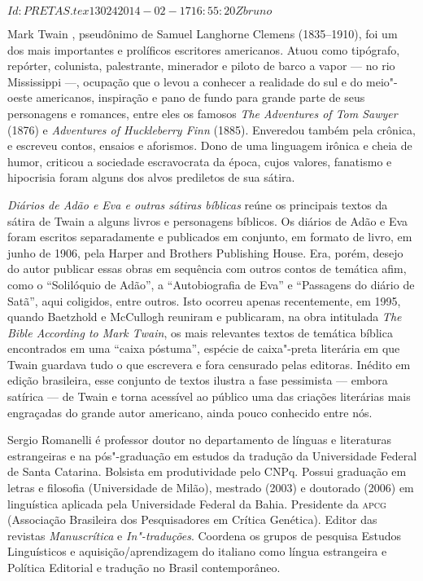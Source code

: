 \SVN $Id: PRETAS.tex 13024 2014-02-17 16:55:20Z bruno $ \begin{resumopage}

\item[Mark Twain], pseudônimo de Samuel Langhorne Clemens
(1835--1910), foi um dos mais importantes e prolíficos escritores americanos.
Atuou como tipógrafo, repórter, colunista, palestrante, minerador e piloto de
barco a vapor --- no rio Mississippi ---, ocupação que o levou a conhecer a
realidade do sul e do meio"-oeste americanos, inspiração e pano de fundo para
grande parte de seus personagens e romances, entre eles os famosos \textit{The
Adventures of Tom Sawyer} (1876) e \textit{Adventures of Huckleberry Finn}
(1885). Enveredou também pela crônica, e escreveu contos, ensaios e aforismos.
Dono de uma linguagem irônica e cheia de humor, criticou a sociedade
escravocrata da época, cujos valores, fanatismo e hipocrisia foram alguns dos
alvos prediletos de sua sátira.

\item[\textit{Diários de Adão e Eva e outras sátiras bíblicas}] reúne os principais
textos da sátira de Twain a alguns livros e personagens bíblicos. Os diários de
Adão e Eva foram escritos separadamente e publicados em conjunto, em formato de
livro, em junho de 1906, pela Harper and Brothers Publishing House. Era, porém,
desejo do autor publicar essas obras em sequência com outros contos de temática
afim, como o “Solilóquio de Adão'', a “Autobiografia de Eva” e “Passagens do
diário de Satã”, aqui coligidos, entre outros. Isto ocorreu apenas recentemente,
em 1995, quando Baetzhold e McCullogh reuniram e publicaram, na obra intitulada
\textit{The Bible According to Mark Twain}, os mais relevantes textos de
temática bíblica encontrados em uma “caixa póstuma”, espécie de caixa"-preta
literária em que Twain guardava tudo o que escrevera e fora censurado pelas
editoras. Inédito em edição brasileira, esse conjunto de textos ilustra a fase
pessimista --- embora satírica --- de Twain e torna acessível ao público uma das
criações literárias mais engraçadas do grande autor americano, ainda pouco
conhecido entre nós.

\item[Sergio Romanelli] é professor doutor no departamento de línguas e
literaturas estrangeiras e na pós"-graduação em estudos da tradução da
Universidade Federal de Santa Catarina. Bolsista em produtividade pelo CNPq.
Possui graduação em letras e filosofia (Universidade de Milão), mestrado (2003)
e doutorado (2006) em linguística aplicada pela Universidade Federal da Bahia.
Presidente da \textsc{apcg} (Associação Brasileira dos Pesquisadores em Crítica
Genética). Editor das revistas \textit{Manuscrítica} e \textit{In"-traduções}.
Coordena os grupos de pesquisa Estudos Linguísticos e aquisição/aprendizagem do
italiano como língua estrangeira e Política Editorial e tradução no Brasil
contemporâneo.


\end{resumopage}
